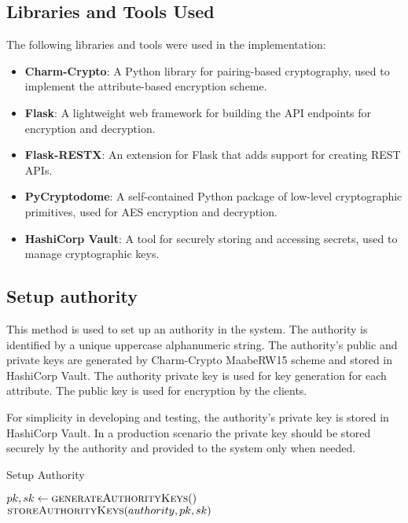 \documentclass[cic,tc,english]{iiufrgs}
\begin{document}
        \subsection{Libraries and Tools Used}
            \label{sec:libraries}

            The following libraries and tools were used in the implementation:

            \begin{itemize}
                \item \textbf{Charm-Crypto}: A Python library for pairing-based cryptography, used to implement the attribute-based encryption scheme.
                \item \textbf{Flask}: A lightweight web framework for building the API endpoints for encryption and decryption.
                \item \textbf{Flask-RESTX}: An extension for Flask that adds support for creating REST APIs.
                \item \textbf{PyCryptodome}: A self-contained Python package of low-level cryptographic primitives, used for AES encryption and decryption.
                \item \textbf{HashiCorp Vault}: A tool for securely storing and accessing secrets, used to manage cryptographic keys.
            \end{itemize}


        \subsection{Setup authority}
            This method is used to set up an authority in the system. The authority is identified by a unique uppercase alphanumeric string. The authority's public and private keys are generated by Charm-Crypto MaabeRW15\cite{rouselakis2015efficient} scheme and stored in HashiCorp Vault. The authority private key is used for key generation for each attribute. The public key is used for encryption by the clients.

            For simplicity in developing and testing, the authority's private key is stored in HashiCorp Vault. In a production scenario the private key should be stored securely by the authority and provided to the system only when needed.

            \begin{algorithm}
                \caption{Setup Authority}
                \label{alg:setup_authority}
                \begin{algorithmic}[1]
                    \State $pk, sk \gets \textsc{generateAuthorityKeys}()$
                    \State $\textsc{storeAuthorityKeys}(authority, pk, sk)$
                \EndProcedure
                \end{algorithmic}
            \end{algorithm}
\end{document}
